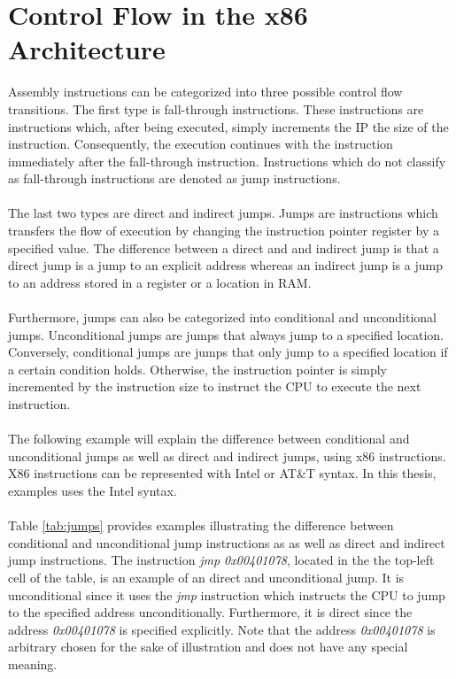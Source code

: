 \documentclass{kththesis}
\begin{document}
\section{Control Flow in the x86 Architecture}
Assembly instructions can be categorized into three possible control flow transitions. The first type is fall-through instructions\cite{CFGFromPowerPC}. These instructions are instructions which, after being executed, simply increments the IP the size of the instruction. Consequently, the execution continues with the instruction immediately after the fall-through instruction. Instructions which do not classify as fall-through instructions are denoted as jump instructions. 
\\ \\
The last two types are direct and indirect jumps. Jumps are instructions which transfers the flow of execution by changing the instruction pointer register by a specified value. The difference between a direct and and indirect jump is that a direct jump is a jump to an explicit address whereas an indirect jump is a jump to an address stored in a register or a location in RAM. 
\\ \\
Furthermore, jumps can also be categorized into conditional and unconditional jumps. Unconditional jumps are jumps that always jump to a specified location. Conversely, conditional jumps are jumps that only jump to a specified location if a certain condition holds. Otherwise, the instruction pointer is simply incremented by the instruction size to instruct the CPU to execute the next instruction. 
\\ \\
The following example will explain the difference between conditional and unconditional jumps as well as direct and indirect jumps, using x86 instructions. X86 instructions can be represented with Intel or AT\&T syntax. In this thesis, examples uses the Intel syntax.
\\ \\ 
Table \ref{tab:jumps} provides examples illustrating the difference between conditional and unconditional jump instructions as as well as direct and indirect jump instructions. The instruction \textit{jmp 0x00401078}, located in the the top-left cell of the table, is an example of an direct and unconditional jump. It is unconditional since it uses the \textit{jmp} instruction which instructs the CPU to jump to the specified address unconditionally. Furthermore, it is direct since the address \textit{0x00401078} is specified explicitly. Note that the address \textit{0x00401078} is arbitrary chosen for the sake of illustration and does not have any special meaning.
\end{document}
